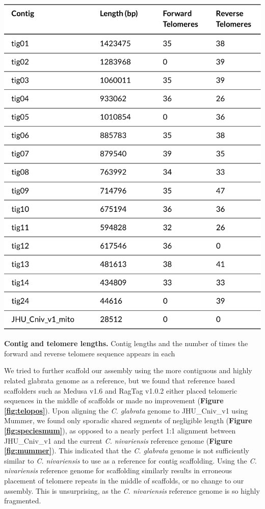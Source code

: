 \begin{table}[!ht]
\centering
\includegraphics[width = .75\linewidth,keepaspectratio]{figure/telotable.pdf}
\caption[Contig and telomere lengths]{{\bf Contig and telomere lengths.} Contig lengths and the number of times the forward and reverse telomere sequence appears in each }
\label{tab:telotable}
\end{table}


We tried to further scaffold our assembly using the more contiguous and highly related glabrata genome as a reference, but we found that reference based scaffolders such as Medusa v1.6 \citep{Bosi2015-rm} and RagTag v1.0.2 \citep{Alonge2019-re} either placed telomeric sequences in the middle of scaffolds or made no improvement ({\bf Figure \ref{fig:telopos}}). Upon aligning the \textit{C. glabrata} genome to JHU\_Cniv\_v1 using Mummer, we found only sporadic shared segments of negligible length ({\bf Figure \ref{fig:speciesmum}}), as opposed to a nearly perfect 1:1 alignment between JHU\_Cniv\_v1 and the current \textit{C. nivariensis} reference genome ({\bf Figure \ref{fig:mummer}}). This indicated that the \textit{C. glabrata} genome is not sufficiently similar to \textit{C. nivariensis} to use as a reference for contig scaffolding. Using the \textit{C. nivariensis} reference genome for scaffolding similarly results in erroneous placement of telomere repeats in the middle of scaffolds, or no change to our assembly. This is unsurprising, as the \textit{C. nivariensis} reference genome is so highly fragmented.


